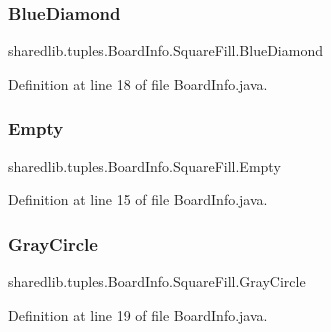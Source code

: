 \subsubsection{\texorpdfstring{Blue\+Diamond}{BlueDiamond}}
{\footnotesize\ttfamily sharedlib.\+tuples.\+Board\+Info.\+Square\+Fill.\+Blue\+Diamond}



Definition at line 18 of file Board\+Info.\+java.

\hypertarget{enumsharedlib_1_1tuples_1_1_board_info_1_1_square_fill_a3b74fd396b72ace18187bde81bd4d658}{}\label{enumsharedlib_1_1tuples_1_1_board_info_1_1_square_fill_a3b74fd396b72ace18187bde81bd4d658} 
\subsubsection{\texorpdfstring{Empty}{Empty}}
{\footnotesize\ttfamily sharedlib.\+tuples.\+Board\+Info.\+Square\+Fill.\+Empty}



Definition at line 15 of file Board\+Info.\+java.

\hypertarget{enumsharedlib_1_1tuples_1_1_board_info_1_1_square_fill_a9b039fababbc4e9c5efb6fb0c9529121}{}\label{enumsharedlib_1_1tuples_1_1_board_info_1_1_square_fill_a9b039fababbc4e9c5efb6fb0c9529121} 
\subsubsection{\texorpdfstring{Gray\+Circle}{GrayCircle}}
{\footnotesize\ttfamily sharedlib.\+tuples.\+Board\+Info.\+Square\+Fill.\+Gray\+Circle}



Definition at line 19 of file Board\+Info.\+java.

\hypertarget{enumsharedlib_1_1tuples_1_1_board_info_1_1_square_fill_ac2c105522cda643298ac9c80209f28de}{}\label{enumsharedlib_1_1tuples_1_1_board_info_1_1_square_fill_ac2c105522cda643298ac9c80209f28de} 
